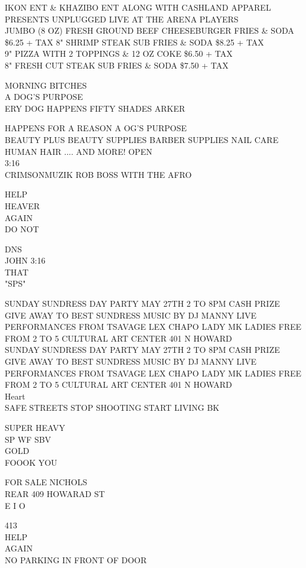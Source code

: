 \documentclass[10pt,letterpaper]{article}
\begin{document}
IKON ENT \& KHAZIBO ENT ALONG WITH CASHLAND APPAREL PRESENTS UNPLUGGED LIVE AT THE ARENA PLAYERS\\
JUMBO (8 OZ) FRESH GROUND BEEF CHEESEBURGER FRIES \& SODA \$6.25 + TAX 8" SHRIMP STEAK SUB FRIES \& SODA \$8.25 + TAX\\
9" PIZZA WITH 2 TOPPINGS \& 12 OZ COKE \$6.50 + TAX\\
8" FRESH CUT STEAK SUB FRIES \& SODA \$7.50 + TAX

MORNING BITCHES\\
A DOG'S PURPOSE\\
ERY DOG HAPPENS FIFTY SHADES ARKER

HAPPENS FOR A REASON A OG'S PURPOSE\\
BEAUTY PLUS BEAUTY SUPPLIES BARBER SUPPLIES NAIL CARE HUMAN HAIR .... AND MORE!  OPEN\\
3:16\\
CRIMSONMUZIK ROB BOSS WITH THE AFRO

HELP\\
HEAVER\\
AGAIN\\
DO NOT

DNS\\
JOHN 3:16\\
THAT\\
"SPS"

SUNDAY SUNDRESS DAY PARTY MAY 27TH 2 TO 8PM CASH PRIZE GIVE AWAY TO BEST SUNDRESS MUSIC BY DJ MANNY LIVE PERFORMANCES FROM TSAVAGE LEX CHAPO LADY MK LADIES FREE FROM 2 TO 5 CULTURAL ART CENTER 401 N HOWARD\\
SUNDAY SUNDRESS DAY PARTY MAY 27TH 2 TO 8PM CASH PRIZE GIVE AWAY TO BEST SUNDRESS MUSIC BY DJ MANNY LIVE PERFORMANCES FROM TSAVAGE LEX CHAPO LADY MK LADIES FREE FROM 2 TO 5 CULTURAL ART CENTER 401 N HOWARD\\
Heart\\
SAFE STREETS STOP SHOOTING START LIVING BK

SUPER HEAVY\\
SP WF SBV\\
GOLD\\
FOOOK YOU

FOR SALE NICHOLS\\
REAR 409 HOWARAD ST\\
E I O

413\\
HELP\\
AGAIN\\
NO PARKING IN FRONT OF DOOR
\end{document}
